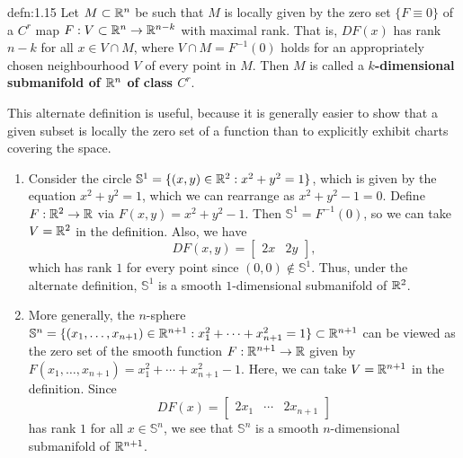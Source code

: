 \begin{defn}{defn:1.15}
    Let $M \subset \mathbb{R}^n$ be such that $M$ is locally given by the zero set 
    $\{F \equiv 0\}$ of a $C^r$ map $F : V \subset \mathbb{R}^n \to \mathbb{R}^{n-k}$ 
    with maximal rank. That is, 
    $DF(x)$ has rank $n - k$ for all $x \in V \cap M$, where $V \cap M 
    = F^{-1}(0)$ holds for an appropriately chosen neighbourhood $V$ 
    of every point in $M$. Then $M$ is called a 
    {\bf $k$-dimensional submanifold of $\mathbb{R}^n$ of class $C^r$}.
\end{defn}\vspace{-0.25cm} 
This alternate definition is useful, because it is generally easier to show 
that a given subset is locally the zero set of a function than to 
explicitly exhibit charts covering the space. 
\begin{enumerate}[(1)]
    \item Consider the circle $\mathbb{S}^1 = \{(x, y) \in \mathbb{R}^2 : x^2 + y^2 = 1\}$, 
    which is given by the equation $x^2 + y^2 = 1$, which we can rearrange as 
    $x^2 + y^2 - 1 = 0$.
    Define $F : \mathbb{R}^2 \to \mathbb{R}$ via $F(x, y) = x^2 + y^2 - 1$. Then $\mathbb{S}^1 
    = F^{-1}(0)$, so we can take $V = \mathbb{R}^2$ in the definition. Also, we have 
    \[ DF(x, y) = \begin{bmatrix}
        2x & 2y 
    \end{bmatrix}, \] 
    which has rank $1$ for every point since $(0, 0) \notin \mathbb{S}^1$. 
    Thus, under the alternate definition, $\mathbb{S}^1$ is a smooth $1$-dimensional
    submanifold of $\mathbb{R}^2$. 

    \item More generally, the $n$-sphere $\mathbb{S}^n = \{(x_1, \dots, 
    x_{n+1}) \in \mathbb{R}^{n+1} : x_1^2 + \cdots + x_{n+1}^2 = 1\} \subset \mathbb{R}^{n+1}$ 
    can be viewed as the zero set of the smooth function $F : \mathbb{R}^{n+1} \to \mathbb{R}$ 
    given by $F(x_1, \dots, x_{n+1}) = x_1^2 + \cdots + x_{n+1}^2 - 1$. 
    Here, we can take $V = \mathbb{R}^{n+1}$ in the definition. Since 
    \[ DF(x) = \begin{bmatrix} 2x_1 & \cdots & 2x_{n+1} \end{bmatrix} \] 
    has rank $1$ for all $x \in \mathbb{S}^n$, we see that $\mathbb{S}^n$ 
    is a smooth $n$-dimensional submanifold of $\mathbb{R}^{n+1}$. 


\end{enumerate}
